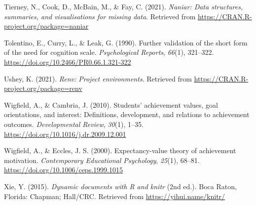 \documentclass[
  man]{apa6}
\newlength{\cslhangindent}
\newlength{\cslentryspacingunit} %
\newenvironment{CSLReferences}[2] %
 {%
  \setlength{\parindent}{0pt}
  \ifodd #1
  \let\oldpar\par
  \def\par{\hangindent=\cslhangindent\oldpar}
  \fi
  \setlength{\parskip}{#2\cslentryspacingunit}
 }%
 {}
\begin{document}
\begin{CSLReferences}{1}{0}
\leavevmode{}%
Tierney, N., Cook, D., McBain, M., \& Fay, C. (2021). \emph{Naniar: Data structures, summaries, and visualisations for missing data}. Retrieved from \url{https://CRAN.R-project.org/package=naniar}

\leavevmode{}%
Tolentino, E., Curry, L., \& Leak, G. (1990). Further validation of the short form of the need for cognition scale. \emph{Psychological Reports}, \emph{66}(1), 321--322. \url{https://doi.org/10.2466/PR0.66.1.321-322}

\leavevmode{}%
Ushey, K. (2021). \emph{Renv: Project environments}. Retrieved from \url{https://CRAN.R-project.org/package=renv}

\leavevmode{}%
Wigfield, A., \& Cambria, J. (2010). Students' achievement values, goal orientations, and interest: Definitions, development, and relations to achievement outcomes. \emph{Developmental Review}, \emph{30}(1), 1--35. \url{https://doi.org/10.1016/j.dr.2009.12.001}

\leavevmode{}%
Wigfield, A., \& Eccles, J. S. (2000). Expectancy-value theory of achievement motivation. \emph{Contemporary Educational Psychology}, \emph{25}(1), 68--81. \url{https://doi.org/10.1006/ceps.1999.1015}

\leavevmode{}%
Xie, Y. (2015). \emph{Dynamic documents with {R} and knitr} (2nd ed.). Boca Raton, Florida: Chapman; Hall/CRC. Retrieved from \url{https://yihui.name/knitr/}

\end{CSLReferences}

\endgroup

\newpage
\end{document}
